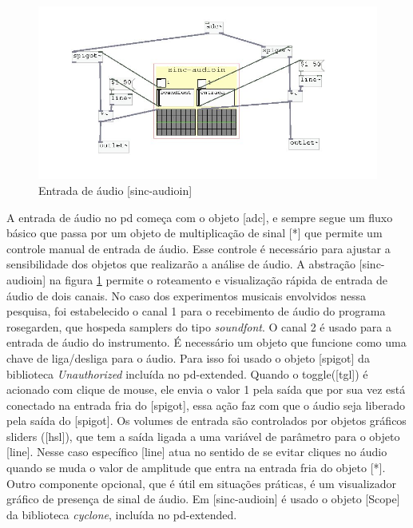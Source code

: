 \documentclass[draft]{ppgmus}
\begin{document}
\begin{figure}
\includegraphics[scale=.55]{audioin}
\caption{Entrada de áudio [sinc-audioin]}
\label{audioin}
\end{figure}

A entrada de áudio no pd começa com o objeto  [adc\texttildelow], e sempre segue um fluxo
básico que passa por um objeto de multiplicação de sinal [*\texttildelow] que permite um
controle manual de entrada de áudio. Esse controle é necessário para ajustar 
a sensibilidade dos objetos que realizarão a análise de áudio. A abstração 
[sinc-audioin] na figura \ref{audioin} permite o roteamento e visualização rápida 
de entrada de áudio de dois canais. No caso dos experimentos musicais envolvidos 
nessa pesquisa, foi estabelecido o canal 1 para o recebimento de áudio do programa 
rosegarden, que hospeda samplers do tipo \textit{soundfont}. O canal 2 é usado para 
a entrada de áudio do instrumento. É necessário um objeto que funcione como uma chave de
liga/desliga para o áudio. Para isso foi usado o objeto [spigot\texttildelow] da biblioteca
\textit{Unauthorized} incluída no pd-extended.
 Quando o toggle([tgl]) é acionado com clique de mouse,
ele envia o valor 1 pela saída que por sua vez está conectado na entrada fria do
[spigot\texttildelow], essa ação faz com que o áudio seja liberado pela saída do [spigot\texttildelow].
Os volumes de entrada são controlados por objetos gráficos sliders ([hsl]), que tem
a saída ligada a uma variável de parâmetro para o objeto [line\texttildelow]. Nesse caso específico
[line\texttildelow] atua no sentido de se evitar cliques no áudio quando se muda o valor de 
amplitude que entra na entrada fria do objeto [*\texttildelow]. Outro componente
opcional, que é útil em situações práticas, é um visualizador gráfico de presença de sinal
de áudio. Em [sinc-audioin] é usado o objeto [Scope\texttildelow] da biblioteca \textit{cyclone}, 
incluída no pd-extended.
\end{document}
